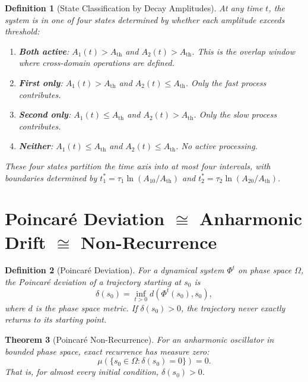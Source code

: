 \documentclass[twocolumn,10pt]{article}
\newtheorem{theorem}{Theorem}[section]
\newtheorem{definition}[theorem]{Definition}
\theoremstyle{remark}
\begin{document}
\begin{definition}[State Classification by Decay Amplitudes]
\label{def:decay_states}
At any time $t$, the system is in one of four states determined by whether each amplitude exceeds threshold:
\begin{enumerate}[label=(\roman*)]
    \item \textbf{Both active}: $A_1(t) > A_{\mathrm{th}}$ and $A_2(t) > A_{\mathrm{th}}$.
    This is the overlap window where cross-domain operations are defined.
    \item \textbf{First only}: $A_1(t) > A_{\mathrm{th}}$ and $A_2(t) \leq A_{\mathrm{th}}$.
    Only the fast process contributes.
    \item \textbf{Second only}: $A_1(t) \leq A_{\mathrm{th}}$ and $A_2(t) > A_{\mathrm{th}}$.
    Only the slow process contributes.
    \item \textbf{Neither}: $A_1(t) \leq A_{\mathrm{th}}$ and $A_2(t) \leq A_{\mathrm{th}}$.
    No active processing.
\end{enumerate}
These four states partition the time axis into at most four intervals, with boundaries determined by $t_1^* = \tau_1\ln(A_{10}/A_{\mathrm{th}})$ and $t_2^* = \tau_2\ln(A_{20}/A_{\mathrm{th}})$.
\end{definition}

\section{\texorpdfstring{Poincar\'{e} Deviation $\cong$ Anharmonic Drift $\cong$ Non-Recurrence}{Poincare Deviation = Anharmonic Drift = Non-Recurrence}}
\label{sec:poincare}

\begin{definition}[Poincar\'{e} Deviation]
\label{def:poincare_dev}
For a dynamical system $\Phi^t$ on phase space $\Omega$, the \emph{Poincar\'{e} deviation} of a trajectory starting at $s_0$ is
\begin{equation}
\delta(s_0) = \inf_{t > 0} d(\Phi^t(s_0), s_0),
\label{eq:poincare_dev}
\end{equation}
where $d$ is the phase space metric.
If $\delta(s_0) > 0$, the trajectory never exactly returns to its starting point.
\end{definition}

\begin{theorem}[Poincar\'{e} Non-Recurrence]
\label{thm:poincare_nonrecurrence}
For an anharmonic oscillator in bounded phase space, exact recurrence has measure zero:
\begin{equation}
\mu\!\left(\{s_0 \in \Omega : \delta(s_0) = 0\}\right) = 0.
\label{eq:measure_zero}
\end{equation}
That is, for almost every initial condition, $\delta(s_0) > 0$.
\end{theorem}
\end{document}

